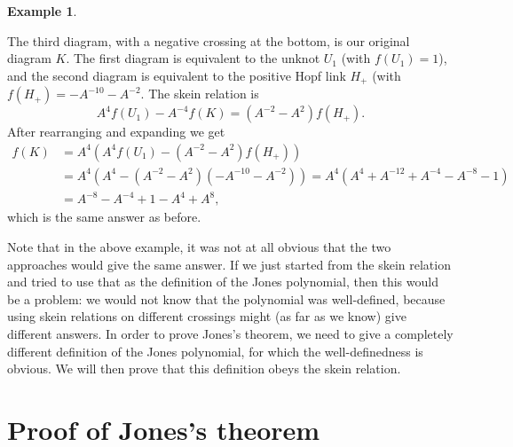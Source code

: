 \documentclass[reqno]{amsart}
\theoremstyle{definition}
\newtheorem{example}[theorem]{Example}
\begin{document}
\begin{example}
\begin{center}
 \end{center}
 The third diagram, with a negative crossing at the bottom, is our
 original diagram $K$.  The first diagram is equivalent to the unknot
 $U_1$ (with $f(U_1)=1$), and the second diagram is equivalent to the
 positive Hopf link $H_+$ (with $f(H_+)=-A^{-10}-A^{-2}$.  The skein
 relation is 
 \[ A^4 f(U_1) - A^{-4} f(K) = (A^{-2} - A^2) f(H_+). \]
 After  rearranging and expanding we get 
 \begin{align*}
  f(K) &= A^4(A^4f(U_1) - (A^{-2}-A^2)f(H_+)) \\
   &= A^4(A^4 - (A^{-2}-A^2)(-A^{-10}-A^{-2})) 
    = A^4(A^4 + A^{-12} + A^{-4} - A^{-8} - 1) \\
   &= A^{-8} - A^{-4} + 1 - A^4 + A^8,
 \end{align*}
 which is the same answer as before.
\end{example}

Note that in the above example, it was not at all obvious that the two
approaches would give the same answer.  If we just started from the
skein relation and tried to use that as the definition of the Jones
polynomial, then this would be a problem: we would not know that the
polynomial was well-defined, because using skein relations on
different crossings might (as far as we know) give different answers.
In order to prove Jones's theorem, we need to give a completely
different definition of the Jones polynomial, for which the
well-definedness is obvious.  We will then prove that this definition
obeys the skein relation.  

\section{Proof of Jones's theorem}
\label{sec-jones-proof}
\end{document}
